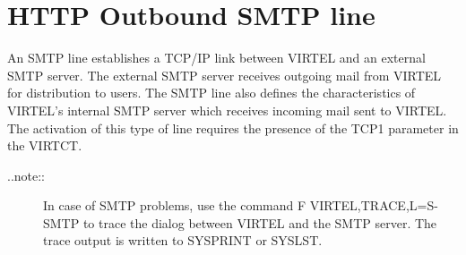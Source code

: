 \documentclass[letterpaper,10pt,english]{sphinxmanual}
\begin{document}
\section{HTTP Outbound SMTP line}
\label{\detokenize{connectivity_guide:http-outbound-smtp-line}}\label{\detokenize{connectivity_guide:index-17}}
An SMTP line establishes a TCP/IP link between VIRTEL and an external SMTP server. The external SMTP server receives outgoing mail from VIRTEL for distribution to users. The SMTP line also defines the characteristics of VIRTEL’s internal SMTP server which receives incoming mail sent to VIRTEL.  The activation of this type of line requires the presence of the TCP1 parameter in the VIRTCT.
\begin{description}
\item[{..note::}] \leavevmode
In case of SMTP problems, use the command F VIRTEL,TRACE,L=S-SMTP to trace the dialog between VIRTEL and the SMTP server. The trace output is written to SYSPRINT or SYSLST.

\end{description}


\ignorespaces 
\end{document}
